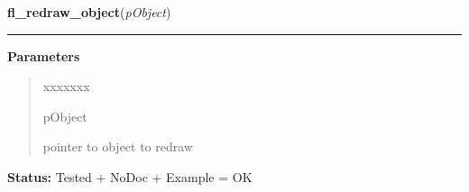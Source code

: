 \hspace{.8\funcindent}\begin{boxedminipage}{\funcwidth}

    \raggedright \textbf{fl\_redraw\_object}(\textit{pObject})

    \vspace{-1.5ex}

    \rule{\textwidth}{0.5\fboxrule}
\setlength{\parskip}{2ex}
\setlength{\parskip}{1ex}
      \textbf{Parameters}
      \vspace{-1ex}

      \begin{quote}
        \begin{Ventry}{xxxxxxx}

          \item[pObject]

          pointer to object to redraw

        \end{Ventry}

      \end{quote}

\textbf{Status:} Tested + NoDoc + Example = OK



    \end{boxedminipage}

    \label{xformslib:library:fl_scale_object}

    \vspace{0.5ex}

